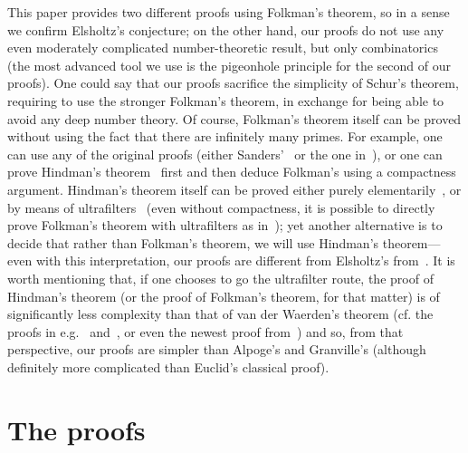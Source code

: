\documentclass[10pt]{amsart}
\theoremstyle{definition}
\begin{document}
This paper provides two different proofs using Folkman's theorem, so in a sense we confirm Elsholtz's conjecture; on the other hand, our proofs do not use any even moderately complicated number-theoretic result, but only combinatorics (the most advanced tool we use is the pigeonhole principle for the second of our proofs). One could say that our proofs sacrifice the simplicity of Schur's theorem, requiring to use the stronger Folkman's theorem, in exchange for being able to avoid any deep number theory. Of course, Folkman's theorem itself can be proved without using the fact that there are infinitely many primes. For example, one can use any of the original proofs (either Sanders'~\cite{sanders} or the one in~\cite[\S 3.4]{graham-rothschild-spencer}), or one can prove Hindman's theorem~\cite{hindman-thm} first and then deduce Folkman's using a compactness argument. Hindman's theorem itself can be proved either purely elementarily~\cite{baumgartner-short-proof-of-hindman}, or by means of ultrafilters~\cite[Corollary 5.10]{hindman-strauss} (even without compactness, it is possible to directly prove Folkman's theorem with ultrafilters as in~\cite[Theorem 20]{dfernandezb-monthly}); yet another alternative is to decide that rather than Folkman's theorem, we will use Hindman's theorem---even with this interpretation, our proofs are different from Elsholtz's from~\cite[Theorem 3]{elsholtz}. It is worth mentioning that, if one chooses to go the ultrafilter route, the proof of Hindman's theorem (or the proof of Folkman's theorem, for that matter) is of significantly less complexity than that of van der Waerden's theorem (cf. the proofs in e.g.~\cite[\S 14.1]{hindman-strauss} and~\cite[pp. 129-130]{dfernandezb-monthly}, or even the newest proof from~\cite{dinasso-new-vanderwaerden}) and so, from that perspective, our proofs are simpler than Alpoge's and Granville's (although definitely more complicated than Euclid's classical proof).

\section{The proofs}
\end{document}
